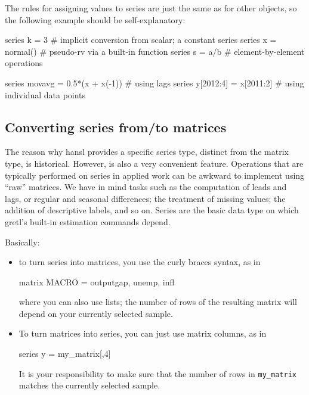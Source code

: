 The rules for assigning values to series are just the same as for
other objects, so the following example should be self-explanatory:
\begin{code}
  series k = 3         # implicit conversion from scalar; a constant series
  series x = normal()  # pseudo-rv via a built-in function
  series s = a/b       # element-by-element operations

  series movavg = 0.5*(x + x(-1)) # using lags
  series y[2012:4] = x[2011:2]    # using individual data points 
\end{code}


\subsection{Converting series from/to matrices}

The reason why hansl provides a specific series type, distinct from
the matrix type, is historical. However, is also a very convenient
feature.  Operations that are typically performed on series in applied
work can be awkward to implement using ``raw'' matrices. We have in
mind tasks such as the computation of leads and lags, or regular and
seasonal differences; the treatment of missing values; the addition of
descriptive labels, and so on. Series are the basic data type on which
gretl's built-in estimation commands depend.

Basically:
\begin{itemize}
\item to turn series into matrices, you use the curly braces syntax,
  as in
  \begin{code}
    matrix MACRO = {outputgap, unemp, infl}
  \end{code}
  where you can also use lists; the number of rows of the resulting
  matrix will depend on your currently selected sample.
\item To turn matrices into series, you can just use matrix columns,
  as in
  \begin{code}
    series y = my_matrix[,4]
  \end{code}
  It is your responsibility to make sure that the number of rows in
  \texttt{my\_matrix} matches the currently selected sample.
\end{itemize}

